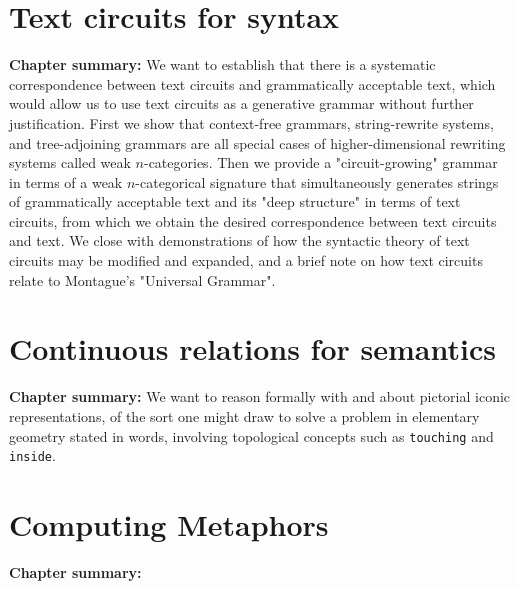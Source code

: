 \chapter{Text circuits for syntax}\label{chapter:textcircuits}
\textbf{Chapter summary:} We want to establish that there is a systematic correspondence between text circuits and grammatically acceptable text, which would allow us to use text circuits as a generative grammar without further justification. First we show that context-free grammars, string-rewrite systems, and tree-adjoining grammars are all special cases of higher-dimensional rewriting systems called weak $n$-categories. Then we provide a "circuit-growing" grammar in terms of a weak $n$-categorical signature that simultaneously generates strings of grammatically acceptable text and its "deep structure" in terms of text circuits, from which we obtain the desired correspondence between text circuits and text. We close with demonstrations of how the syntactic theory of text circuits may be modified and expanded, and a brief note on how text circuits relate to Montague's "Universal Grammar".
\newpage
\label{sec:ncat}
\newpage

\newpage

\newpage


\chapter{Continuous relations for semantics}\label{chapter:contrel}
\textbf{Chapter summary:} We want to reason formally with and about pictorial iconic representations, of the sort one might draw to solve a problem in elementary geometry stated in words, involving topological concepts such as \texttt{touching} and \texttt{inside}.
\newpage

\newpage

\newpage

\newpage

\newpage
\label{sec:topconcepts}
\newpage


\newpage
\chapter{Computing Metaphors}
\textbf{Chapter summary:}
\newpage

\newpage
\label{sec:metaphor}








